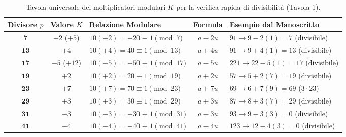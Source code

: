 \documentclass[11pt,a4paper,oneside]{report}
\begin{document}
\begin{table}[H]
\centering
\small
\renewcommand{\arraystretch}{1.25}
\begin{tabularx}{\textwidth}{c c l c X}
\toprule
\textbf{Divisore $p$} & \textbf{Valore $K$} & \textbf{Relazione Modulare} & \textbf{Formula} & \textbf{Esempio dal Manoscritto} \\
\midrule
$\mathbf{7}$  & $-2$ ($+5$) & $10(-2) = -20 \equiv 1 \pmod 7$     & $a - 2u$ & $91 \to 9 - 2(1) = 7$ (divisibile) \\
$\mathbf{13}$ & $+4$        & $10(+4) = 40 \equiv 1 \pmod{13}$    & $a + 4u$ & $91 \to 9 + 4(1) = 13$ (divisibile) \\
$\mathbf{17}$ & $-5$ ($+12$)& $10(-5) = -50 \equiv 1 \pmod{17}$   & $a - 5u$ & $221 \to 22 - 5(1) = 17$ (divisibile) \\
$\mathbf{19}$ & $+2$        & $10(+2) = 20 \equiv 1 \pmod{19}$    & $a + 2u$ & $57 \to 5 + 2(7) = 19$ (divisibile) \\
$\mathbf{23}$ & $+7$        & $10(+7) = 70 \equiv 1 \pmod{23}$    & $a + 7u$ & $69 \to 6 + 7(9) = 69$ ($3 \cdot 23$) \\
$\mathbf{29}$ & $+3$        & $10(+3) = 30 \equiv 1 \pmod{29}$    & $a + 3u$ & $87 \to 8 + 3(7) = 29$ (divisibile) \\
$\mathbf{31}$ & $-3$        & $10(-3) = -30 \equiv 1 \pmod{31}$   & $a - 3u$ & $93 \to 9 - 3(3) = 0$ (divisibile) \\
$\mathbf{41}$ & $-4$        & $10(-4) = -40 \equiv 1 \pmod{41}$   & $a - 4u$ & $123 \to 12 - 4(3) = 0$ (divisibile) \\
\bottomrule
\end{tabularx}
\caption{Tavola universale dei moltiplicatori modulari $K$ per la verifica rapida di divisibilit\`a (Tavola 1).}
\end{table}
\end{document}
